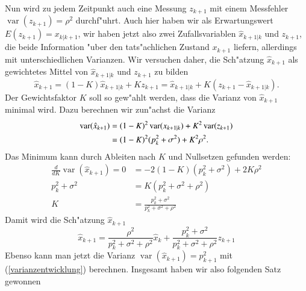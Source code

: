 Nun wird zu jedem Zeitpunkt auch eine Messung $z_{k+1}$ mit einem Messfehler
$\operatorname{var}(z_{k+1})=\rho^2$ durchf"uhrt.
Auch hier haben wir als
Erwartungswert $E(z_{k+1})=x_{k|k+1}$, wir haben jetzt also zwei Zufallsvariablen
$\hat x_{k+1|k}$ und $z_{k+1}$, die beide Information "uber den tats"achlichen
Zustand $x_{k+1}$ liefern, allerdings mit unterschiedlichen Varianzen.
Wir
versuchen daher, die Sch"atzung $\hat x_{k+1}$ als gewichtetes Mittel 
von $\hat x_{k+1|k}$ und $z_{k+1}$ zu bilden
\begin{equation}
\hat x_{k+1}=(1-K)\hat x_{k+1|k}+Kz_{k+1}=\hat x_{k+1|k}+K( z_{k+1} - \hat x_{k+1|k}).
\label{1dimentwicklung}
\end{equation}
Der Gewichtsfaktor $K$ soll so gew"ahlt werden, dass die Varianz von $\hat x_{k+1}$
minimal wird.
Dazu berechnen wir zun"achst die Varianz
\begin{align}
\operatorname{var}(\hat x_{k+1})
&=
(1-K)^2\operatorname{var}(x_{k+1|k})+K^2\operatorname{var}(z_{k+1})\notag\\
&=(1-K)^2(p_k^2+\sigma^2)+K^2\rho^2.\label{varianzentwicklung}
\end{align}
Das Minimum kann durch Ableiten nach $K$ und Nullsetzen gefunden werden:
\begin{align*}
\frac{d}{dK}\operatorname{var}(\hat x_{k+1})
=0&=
-2(1-K)(p_k^2+\sigma^2)+2K\rho^2\\
p_k^2+\sigma^2&=K(p_k^2+\sigma^2+\rho^2)\\
K&=\frac{p_k^2+\sigma^2}{p_k^2+\sigma^2+\rho^2}
\end{align*}
Damit wird die Sch"atzung $\hat x_{k+1}$
\[
\hat x_{k+1}=\frac{\rho^2}{p_k^2+\sigma^2+\rho^2}\hat x_k+\frac{p_k^2+\sigma^2}{p_k^2+\sigma^2+\rho^2}z_{k+1}
\]
Ebenso kann man jetzt die Varianz $\operatorname{var}(\hat x_{k+1})=p_{k+1}^2$
mit (\ref{varianzentwicklung}) berechnen.
Insgesamt haben wir also folgenden
Satz gewonnen

